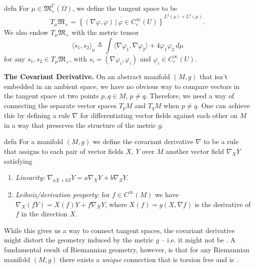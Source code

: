 \documentclass[11pt]{article}
\newcommand{\man}{M}
\begin{document}
\begin{restatable}{defn}{}
    For $\mu \in \mathfrak{M}_+^\Gamma(\Omega)$, we define the tangent space to be 
    \begin{equation}
        T_\mu \mathfrak{M}_+ = \overline{\left\{(\nabla \varphi, \varphi) \, | \, \varphi \in C_c^{\infty}(U)\right\}}^{L^2(\mu) \times L^2(\mu)}.
    \end{equation}
    We also endow $T_\mu \mathfrak{M}_+$ with the metric tensor
    \begin{equation}
        \langle s_1,  s_2\rangle_{\mu} \triangleq \int \langle\nabla\varphi_1, \nabla\varphi_2\rangle + 4\varphi_1\varphi_2 \,  d\mu
    \end{equation}
    for any $s_1, s_2\in T_\mu \mathfrak{M}_+$, with $s_i = (\nabla \varphi_i, \varphi_i)$ and $\varphi_i \in C_c^\infty(U)$. 
\end{restatable}

\noindent \textbf{The Covariant Derivative.} 
On an abstract manifold $(\man, g)$ that isn't embedded in an ambient space, we have no obvious way to compare vectors in the tangent space at two points $p, q \in \man$, $p \neq q$. Therefore, we need a way of connecting the separate vector spaces $T_p\man$ and $T_q\man$ when $p \neq q$. One can achieve this by defining a rule $\nabla$ for differentiating vector fields against each other on $\man$ in a way that preserves the structure of the metric $g$.

\begin{restatable}{defn}{}
    For a manifold $(\man, g)$ we define the covariant derivative $\nabla$ to be a rule that assigns to each pair of vector fields $X$, $Y$ over $\man$ another vector field $\nabla_XY$ satisfying 
    \begin{enumerate}
        \item \textit{Linearity:} $\nabla_{aX+bZ}Y = a\nabla_XY + b\nabla_ZY.$
        \item \textit{Leibniz/derivation property:} for $f \in C^{\infty}(\man)$ we have $\nabla_X(fY) = X(f)Y + f\nabla_XY$, where $X(f) = g(X, \nabla f)$ is the derivative of $f$ in the direction $X$.
    \end{enumerate}
\end{restatable}

While this gives us a way to connect tangent spaces, the covariant derivative might distort the geometry induced by the metric $g$ -- i.e. it might not be . A fundamental result of Riemannian geometry, however, is that for any Riemannian manifold $(\man, g)$ there exists a \textit{unique} connection that is torsion free and is . 
\end{document}
